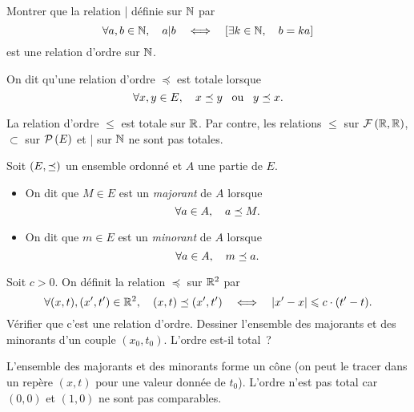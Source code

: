 \documentclass{magnoliaold}
\begin{document}
\begin{exoUnique}
\exo Montrer que la relation | définie sur $\mathbb{N}$ par
  \[\forall a,b\in\mathbb{N} ,\quad a|b \quad\Longleftrightarrow\quad \left[\exists k\in\mathbb{N} ,\quad b=ka\right]\]
  est une relation d'ordre sur $\mathbb{N}$.
\end{exoUnique}


\begin{definition}[utile=-3]
On dit qu'une relation d'ordre $\preceq$ est totale lorsque
\[\forall x,y\in E ,\quad x\preceq y \quad\!\text{ou}\quad\! y\preceq x.\]
\end{definition}

\begin{remarqueUnique}
\remarque La relation d'ordre $\leq$ est totale sur $\mathbb{R}$. Par contre, les
  relations $\leq$ sur $\mathcal{F}\left(\mathbb{R},\mathbb{R}\right)$, $\subset$ sur $\mathcal{P}\left(E\right)$ et
  | sur $\mathbb{N}$ ne sont pas totales.
\end{remarqueUnique}


\begin{definition}[utile=-3]
Soit $\left(E,\preceq\right)$ un ensemble ordonné et $A$ une partie de $E$.
\begin{itemize}
\item On dit que $M\in E$ est un \emph{majorant} de $A$ lorsque
  \[\forall a\in A ,\quad a\preceq M.\]
\item On dit que $m\in E$ est un \emph{minorant} de $A$ lorsque
  \[\forall a\in A ,\quad m\preceq a.\]
\end{itemize}
\end{definition}

\begin{exoUnique}
\exo Soit $c>0$. On définit la relation $\preceq$ sur $\mathbb{R}^2$ par
  \[\forall (x,t),(x',t')\in\mathbb{R}^2 ,\quad (x,t)\preceq (x',t')\quad\Longleftrightarrow\quad \left|x'-x\right|\leqslant c\cdot (t'-t).\]
  Vérifier que c'est une relation d'ordre. Dessiner l'ensemble des majorants et
  des minorants d'un couple $(x_0,t_0)$. L'ordre est-il total~?
  \begin{sol}
  L'ensemble des majorants et des minorants forme un cône (on peut le tracer dans un repère $(x,t)$ pour une valeur donnée de $t_0$). L'ordre n'est pas
  total car $(0,0)$ et $(1,0)$ ne sont pas comparables.
  \end{sol}
\end{exoUnique}
\end{document}
